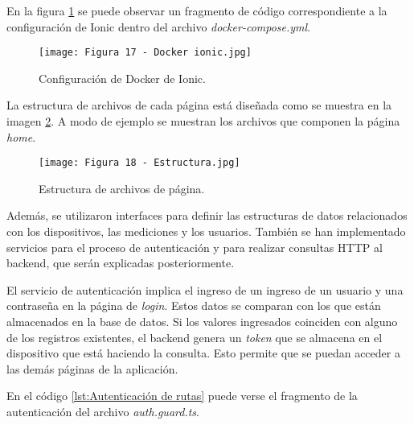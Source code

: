 En la figura \ref{fig:17} se puede observar un fragmento de código correspondiente a la configuración de Ionic dentro del archivo \textit{docker-compose.yml}.

\begin{figure}[h]
\centering
\texttt{[image: Figura 17 - Docker ionic.jpg]}
\caption[Configuración de Docker de Ionic]{Configuración de Docker de Ionic.}
\label{fig:17}
\end{figure}

La estructura de archivos de cada página está diseñada como se muestra en la imagen \ref{fig:18}. A modo de ejemplo se muestran los archivos que componen la página \textit{home}.

\newpage
\begin{figure}[h]
\centering
\texttt{[image: Figura 18 - Estructura.jpg]}
\caption[Estructura de archivos de página]{Estructura de archivos de página.}
\label{fig:18}
\end{figure}

Además, se utilizaron interfaces para definir las estructuras de datos relacionados con los dispositivos, las mediciones y los usuarios. También se han implementado servicios para el proceso de autenticación y para realizar consultas HTTP al backend, que serán explicadas posteriormente.

El servicio de autenticación implica el ingreso de un ingreso de un usuario y una contraseña en la página de \textit{login}. Estos datos se comparan con los que están almacenados en la base de datos. Si los valores ingresados coinciden con alguno de los registros existentes, el backend genera un \textit{token} que se almacena en el dispositivo que está haciendo la consulta. Esto permite que se puedan acceder a las demás páginas de la aplicación.

En el código \ref{lst:Autenticación de rutas} puede verse el fragmento de la autenticación del archivo \linebreak \textit{auth.guard.ts}.



